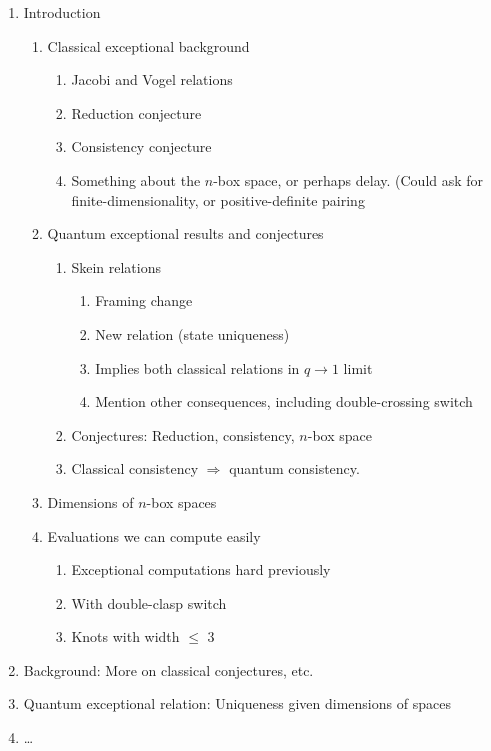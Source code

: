 \documentclass[12pt]{amsart}
\begin{document}
\begin{enumerate}
\item Introduction
  \begin{enumerate}
  \item Classical exceptional background
    \begin{enumerate}
    \item Jacobi and Vogel relations
    \item Reduction conjecture
    \item Consistency conjecture
    \item Something about the $n$-box space, or perhaps delay. (Could
      ask for finite-dimensionality, or positive-definite pairing
    \end{enumerate}
  \item Quantum exceptional results and conjectures
    \begin{enumerate}
    \item Skein relations
      \begin{enumerate}
      \item Framing change
      \item New relation (state uniqueness)
      \item Implies both classical relations in $q \to 1$ limit
      \item Mention other consequences, including double-crossing switch
      \end{enumerate}
    \item Conjectures: Reduction, consistency, $n$-box space
    \item Classical consistency $\Rightarrow$ quantum consistency.
    \end{enumerate}
  \item Dimensions of $n$-box spaces
  \item Evaluations we can compute easily
    \begin{enumerate}
    \item Exceptional computations hard previously
    \item With double-clasp switch
    \item Knots with width $\le$ 3
    \end{enumerate}
  \end{enumerate}
\item Background: More on classical conjectures, etc.
\item Quantum exceptional relation: Uniqueness given dimensions of spaces
\item \dots
\end{enumerate}
\end{document}
